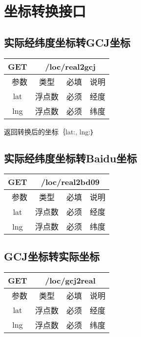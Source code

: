 \documentclass[cs4size]{ctexartutf8}
\begin{document}
\section{坐标转换接口}

\subsection{实际经纬度坐标转GCJ坐标}

\begin{table}[H]
   \begin{center}
\begin{tabular}{|c|c|c|p{12cm}|}
\hline
GET & \multicolumn{3}{|c|}{/loc/real2gcj} \\
\hline\hline
 \  参数  & 类型 & 必填 &  说明  \\
\hline
 lat  & 浮点数 & 必须 & 经度\\
\hline
 lng  &  浮点数 & 必须 & 纬度\\ 
\hline
\end{tabular}
   \end{center}
\end{table}

返回转换后的坐标｛lat:, lng:｝

\subsection{实际经纬度坐标转Baidu坐标}

\begin{table}[H]
   \begin{center}
\begin{tabular}{|c|c|c|p{12cm}|}
\hline
GET & \multicolumn{3}{|c|}{/loc/real2bd09} \\
\hline\hline
 \  参数  & 类型 & 必填 &  说明  \\
\hline
 lat  & 浮点数 & 必须 & 经度\\
\hline
 lng  &  浮点数 & 必须 & 纬度\\ 
\hline
\end{tabular}
   \end{center}
\end{table}


\subsection{GCJ坐标转实际坐标}

\begin{table}[H]
   \begin{center}
\begin{tabular}{|c|c|c|p{12cm}|}
\hline
GET & \multicolumn{3}{|c|}{/loc/gcj2real} \\
\hline\hline
 \  参数  & 类型 & 必填 &  说明  \\
\hline
 lat  & 浮点数 & 必须 & 经度\\
\hline
 lng  &  浮点数 & 必须 & 纬度\\ 
\hline
\end{tabular}
   \end{center}
\end{table}
\end{document}
